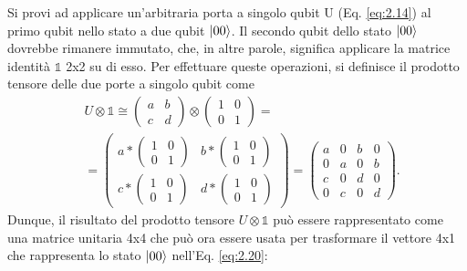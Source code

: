 Si provi ad applicare un'arbitraria porta a singolo qubit U (Eq. \ref{eq:2.14}) 
al primo qubit nello stato a due qubit $\ket{00}$. Il secondo qubit dello stato 
$\ket{00}$ dovrebbe rimanere immutato, che, in altre parole, significa applicare 
la matrice identità $\mathbb{1}$ 2x2 su di esso. Per effettuare queste operazioni, 
si definisce il prodotto tensore delle due porte a singolo qubit come 
\begin{equation}
    \begin{split}
    &U\otimes\mathbb{1}\cong
    \begin{pmatrix}
        a&b\\c&d
    \end{pmatrix}
    \otimes
    \begin{pmatrix}
        1&0\\0&1
    \end{pmatrix} = \\
    &=
    \begin{pmatrix}
        a*
        \begin{pmatrix}
            1&0\\0&1
        \end{pmatrix}
        &b*
        \begin{pmatrix}
            1&0\\0&1
        \end{pmatrix}
        \\c*
        \begin{pmatrix}
            1&0\\0&1
        \end{pmatrix}
        &d*
        \begin{pmatrix}
            1&0\\0&1
        \end{pmatrix}
    \end{pmatrix}
    =
    \begin{pmatrix}
        a&0&b&0\\
        0&a&0&b\\
        c&0&d&0\\
        0&c&0&d
    \end{pmatrix}.
    \end{split}
\end{equation} %
Dunque, il risultato del prodotto tensore $U\otimes\mathbb{1}$ può essere 
rappresentato come una matrice unitaria 4x4 che può ora essere usata per 
trasformare il vettore 4x1 che rappresenta lo stato $\ket{00}$ nell'Eq. \ref{eq:2.20}: 
